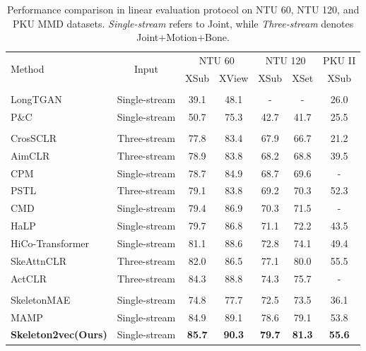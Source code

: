 \begin{table}[tb] \scriptsize
    \caption{
      Performance comparison in linear evaluation protocol
      on NTU 60, NTU 120, and PKU MMD datasets.
      \textit{Single-stream} refers to Joint,
      while \textit{Three-stream} denotes Joint+Motion+Bone.
    }
    \centering
    \setlength{\tabcolsep}{4pt} %
    \begin{tabular}{l c c c c c c}
      \toprule
      \multirow{2}{*}{Method} &
      \multirow{2}{*}{Input} &
      \multicolumn{2}{c}{NTU 60} &
      \multicolumn{2}{c}{NTU 120} &
      PKU II\\
      & & XSub & XView & XSub & XSet & XSub \\
      \midrule
      \rowcolor{Gray!20} \multicolumn{7}{l}{\textit{Other pretext tasks:}} \\
      LongTGAN \cite{zheng2018unsupervised} & Single-stream & 39.1 & 48.1 & - & - & 26.0 \\
      P\&C \cite{su2020predict} & Single-stream & 50.7 & 75.3 & 42.7 & 41.7 & 25.5 \\
      \midrule
      \rowcolor{Gray!20} \multicolumn{7}{l}{\textit{Contrastive Learning:}} \\
      CrosSCLR \cite{li20213d} & Three-stream & 77.8 & 83.4 & 67.9 & 66.7 & 21.2 \\
      AimCLR \cite{guo2022contrastive} & Three-stream & 78.9 & 83.8 & 68.2  & 68.8 & 39.5 \\
      CPM \cite{zhang2022contrastive} & Single-stream & 78.7 & 84.9 & 68.7 & 69.6 & - \\
      PSTL \cite{Zhou2023SelfsupervisedAR} & Three-stream & 79.1 & 83.8 & 69.2 & 70.3 & 52.3 \\
      CMD \cite{mao2022cmd} & Single-stream & 79.4 & 86.9 & 70.3 & 71.5 & - \\
      HaLP \cite{shah2023halp} & Single-stream & 79.7 & 86.8 & 71.1 & 72.2 & 43.5 \\
      HiCo-Transformer \cite{hico2023} & Single-stream & 81.1 & 88.6 & 72.8 & 74.1 & 49.4 \\
      SkeAttnCLR \cite{Hua2023SkeAttnCLR} & Three-stream & 82.0 & 86.5 & 77.1 & 80.0 & 55.5 \\
      ActCLR \cite{lin2023actionlet} & Three-stream & 84.3 & 88.8 & 74.3 & 75.7 & - \\
      \midrule
      \rowcolor{Gray!20} \multicolumn{7}{l}{\textit{Masked Prediction:}} \\
      SkeletonMAE \cite{yan2023skeletonmae} & Single-stream & 74.8 & 77.7 & 72.5 & 73.5 & 36.1 \\
      MAMP \cite{mao2023masked} & Single-stream & 84.9 & 89.1 & 78.6 & 79.1 & 53.8 \\
      \textbf{Skeleton2vec(Ours)} & Single-stream & \textbf{85.7} & \textbf{90.3} & \textbf{79.7} & \textbf{81.3} & \textbf{55.6} \\
      \bottomrule
    \end{tabular}
    \label{tab:linear}
    \vspace{-15pt}
\end{table}

